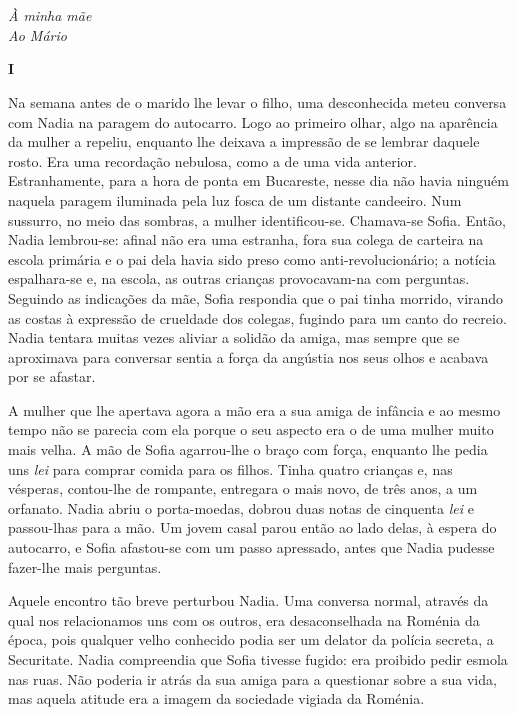 \chapter*{}
\thispagestyle{empty}

\begin{flushright}
\vfill
\emph{À minha mãe\\Ao Mário}
\end{flushright}

\pagebreak
\thispagestyle{empty}
\movetooddpage

\pagebreak
\vspace*{1.8cm}
\noindent{}\textbf{I}

\bigskip

Na semana antes de o marido lhe levar o filho, uma desconhecida meteu
conversa com Nadia na paragem do autocarro. Logo ao primeiro olhar, algo
na aparência da mulher a repeliu, enquanto lhe deixava a impressão de se
lembrar daquele rosto. Era uma recordação nebulosa, como a de uma vida
anterior. Estranhamente, para a hora de ponta em Bucareste, nesse dia
não havia ninguém naquela paragem iluminada pela luz fosca de um
distante candeeiro. Num sussurro, no meio das sombras, a mulher
identificou-se. Chamava-se Sofia. Então, Nadia lembrou-se: afinal não era uma estranha, fora sua colega de carteira na
escola primária e o pai dela havia sido preso como anti-revolucionário;
a notícia espalhara-se e, na escola, as outras crianças provocavam-na
com perguntas. Seguindo as indicações da mãe, Sofia respondia que o pai
tinha morrido, virando as costas à expressão de crueldade dos colegas,
fugindo para um canto do recreio. Nadia tentara muitas vezes aliviar a
solidão da amiga, mas sempre que se aproximava para conversar sentia a
força da angústia nos seus olhos e acabava por se afastar.

A mulher que lhe apertava agora a mão era a sua amiga de infância e ao
mesmo tempo não se parecia com ela porque o seu aspecto era o de uma
mulher muito mais velha. A mão de Sofia agarrou-lhe o braço com força,
enquanto lhe pedia uns \emph{lei }para comprar comida para os filhos.
Tinha quatro crianças e, nas vésperas, contou-lhe de rompante, entregara
o mais novo, de três anos, a um orfanato. Nadia abriu o porta-moedas,
dobrou duas notas de cinquenta \emph{lei }e passou-lhas para a mão. Um
jovem casal parou então ao lado delas, à espera do autocarro, e Sofia
afastou-se com um passo apressado, antes que Nadia pudesse fazer-lhe
mais perguntas.

Aquele encontro tão breve perturbou Nadia. Uma conversa normal,
através da qual nos relacionamos uns com os outros, era desaconselhada
na Roménia da época, pois qualquer velho conhecido podia ser um delator
da polícia secreta, a Securitate. Nadia compreendia que Sofia tivesse
fugido: era proibido pedir esmola nas ruas. Não poderia ir atrás da sua
amiga para a questionar sobre a sua vida, mas aquela atitude era a
imagem da sociedade vigiada da Roménia.

